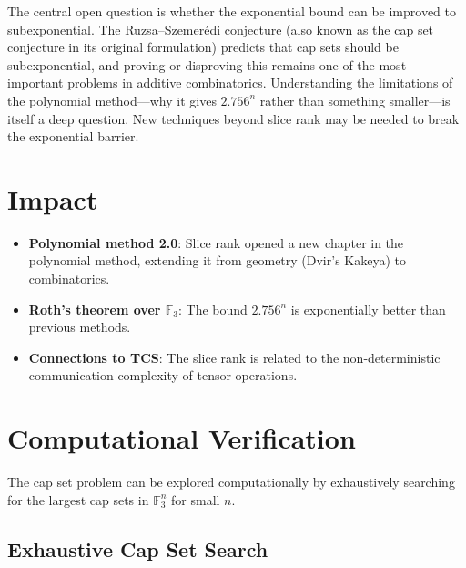 The central open question is whether the exponential bound can be improved to subexponential. The Ruzsa--Szemer\'{e}di conjecture (also known as the cap set conjecture in its original formulation) predicts that cap sets should be subexponential, and proving or disproving this remains one of the most important problems in additive combinatorics. Understanding the limitations of the polynomial method---why it gives $2.756^n$ rather than something smaller---is itself a deep question. New techniques beyond slice rank may be needed to break the exponential barrier.

\section{Impact}
\begin{itemize}
\item \textbf{Polynomial method 2.0}: Slice rank opened a new chapter in the polynomial method, extending it from geometry (Dvir's Kakeya) to combinatorics.
\item \textbf{Roth's theorem over $\mathbb{F}_3$}: The bound $2.756^n$ is exponentially better than previous methods.
\item \textbf{Connections to TCS}: The slice rank is related to the non-deterministic communication complexity of tensor operations.
\end{itemize}

\section{Computational Verification}

The cap set problem can be explored computationally by exhaustively searching for the largest cap sets in $\mathbb{F}_3^n$ for small $n$.

\subsection{Exhaustive Cap Set Search}

